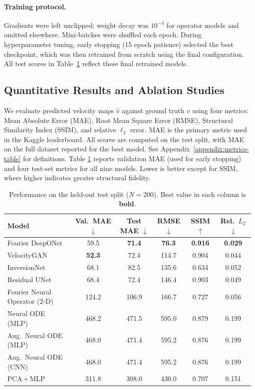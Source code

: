\documentclass{article}
\begin{document}
\paragraph{Training protocol.}  

Gradients were left unclipped; weight decay was $10^{-4}$ for operator models and omitted elsewhere. Mini-batches were shuffled each epoch. During hyperparameter tuning, early stopping (15 epoch patience) selected the best checkpoint, which was then retrained from scratch using the final configuration. All test scores in Table~\ref{tab:quant} reflect these final retrained models.

\subsection{Quantitative Results and Ablation Studies}

We evaluate predicted velocity maps $\hat{v}$ against ground truth $v$ using four metrics: Mean Absolute Error (MAE), Root Mean Square Error (RMSE), Structural Similarity Index (SSIM), and relative $\ell_2$ error. MAE is the primary metric used in the Kaggle leaderboard. All scores are computed on the test split, with MAE on the full dataset reported for the best model. See Appendix~\ref{appendix:metrics-table} for definitions. Table \ref{tab:quant} reports validation MAE (used for early stopping) and four
test-set metrics for all nine models.  Lower is better except for SSIM, where
higher indicates greater structural fidelity.

\begin{table}
\centering
\small
\renewcommand{\arraystretch}{1.15}
\setlength{\tabcolsep}{5pt}
\begin{tabular}{@{}lccccc@{}}
\toprule
\textbf{Model} & \textbf{Val.\ MAE} $\downarrow$ & \textbf{Test MAE} $\downarrow$ & \textbf{RMSE} $\downarrow$ & \textbf{SSIM} $\uparrow$ & \textbf{Rel.\ $L_2$} $\downarrow$ \\
\midrule
Fourier DeepONet                & 59.5 & \textbf{71.4} & \textbf{76.3} & \textbf{0.916} & \textbf{0.029} \\
VelocityGAN                     & \textbf{52.3} & 72.4 & 114.7 & 0.904 & 0.044 \\
InversionNet                    & 68.1 & 82.5 & 135.6 & 0.634 & 0.052 \\
Residual UNet                   & 68.4 & 72.4 & 146.4 & 0.903 & 0.049 \\
Fourier Neural Operator (2-D)   & 124.2 & 106.9 & 166.7 & 0.727 & 0.056 \\
Neural ODE (MLP)                & 468.2 & 471.5 & 595.0 & 0.879 & 0.199 \\
Aug.\ Neural ODE (MLP)          & 468.0 & 471.4 & 595.2 & 0.876 & 0.199 \\
Aug.\ Neural ODE (CNN)          & 468.0 & 471.4 & 595.2 & 0.876 & 0.199 \\
PCA\,+\,MLP                     & 311.8 & 308.0 & 430.0 & 0.707 & 0.151 \\
\bottomrule
\end{tabular}
\caption{Performance on the held-out test split (\(N\!=\!200\)).
Best value in each column is \textbf{bold}.}
\label{tab:quant}
\end{table}
\end{document}
